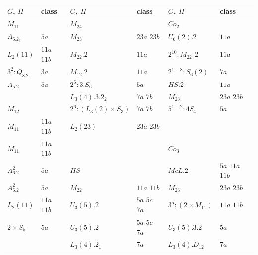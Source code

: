 \documentclass{article}
\theoremstyle{remark}
\theoremstyle{definition}
\begin{document}
\begin{table}
\centering

\begin{tabular}{ | l| l || l | l|| l| l|}   \hline    \underline{$G$}, $H$ & class & \underline{$G$}, $H$  & class& \underline{$G$}, $H$ & class \\
\hline \hline
\underline{$M_{11}$}        &                   & \underline{$M_{24}$}       &               & \underline{$Co_2$} &  \\
$A_6.2_3$                   & $5a$              & $M_{23}$                   & $23a$ $23b$   & $U_6(2).2$  & $11a$ \\
$L_2(11)$                   & $11a$ $11b$       & $M_{22}.2$                 & $11a$         & $2^{10}:M_{22}:2$  & $11a$ \\
$3^2:Q_8.2$                 & $3a$              & $M_{12}.2$                 & $11a$         & $2^{1+8}:S_6(2)$  & $7a$ \\
$A_5.2$                     & $5a$              & $2^6:3.S_6$                & $5a$          & $HS.2$  & $11a$ \\
                            &                   & $L_3(4).3.2_2$             & $7a$ $7b$     & $M_{23}$  & $23a$ $23b$ \\
\underline{$M_{12}$}        &                   & $2^6:(L_3(2)\times S_3)$   & $7a$ $7b$     & $5^{1+2}:4S_4$  & $5a$ \\
$M_{11}$                    & $11a$ $11b$       & $L_2(23)$                  & $23a$ $23b$   &  &  \\
$M_{11}$                    & $11a$ $11b$       &                            &               & \underline{$Co_3$} &  \\
$A_6.2^2$                   & $5a$              & \underline{$HS$}           &               & $McL.2$  & $5a$ $11a$ $11b$ \\
$A_6.2^2$                   & $5a$              & $M_{22}$                   & $11a$ $11b$   & $M_{23}$  & $23a$ $23b$ \\
$L_2(11)$                   & $11a$ $11b$       & $U_3(5).2$             & $5a$ $5c$ $7a$    & $3^5:(2\times M_{11})$  & $11a$ $11b$ \\
$2\times S_5$               & $5a$              & $U_3(5).2$                 & $5a$ $5c$ $7a$    & $U_3(5).3.2$  & $5a$ \\
                            &                   & $L_3(4).2_1$           & $7a$              & $L_3(4).D_{12}$  & $7a$ \\

\end{tabular}
\end{table}
\end{document}
